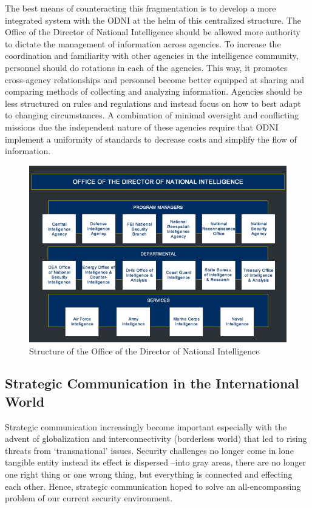 \documentclass{report}
\begin{document}
The best means of counteracting this fragmentation is to develop a more integrated system with the ODNI at the helm of this  centralized structure. The Office of the Director of National Intelligence should be allowed more authority to dictate the management of information across agencies.  To increase the coordination and familiarity with other agencies in the intelligence community, personnel should do rotations in each of the agencies. This way, it promotes cross-agency relationships and personnel become better equipped at sharing and comparing methods of collecting and analyzing information.  Agencies should be less structured on rules and regulations and instead focus on how to best adapt to changing circumstances. A combination of minimal oversight and conflicting missions due the independent nature of these agencies \cite{Zegart2005} require that ODNI implement a uniformity of standards to decrease costs and simplify the flow of information. 

\begin{figure}[h]
 \centering
 \includegraphics[trim = 0cm 0cm 0cm 0cm, clip,scale=0.7]{./figures/structure_infographic.jpg}
   \caption{Structure of the Office of the Director of National Intelligence \cite{OfficeoftheDirectorofNationalIntelligence}}
     \label{fig:structure_infographic}
\end{figure}


\subsection{Strategic Communication in the International World}

Strategic communication increasingly become important especially with the advent of globalization and interconnectivity (borderless world) that led to rising threats from ‘transnational’ issues. Security challenges no longer come in lone tangible entity instead its effect is dispersed –into gray areas, there are no longer one right thing or one wrong thing, but everything is connected and effecting each other. Hence, strategic communication hoped to solve an all-encompassing problem of our current security environment.
\end{document}
